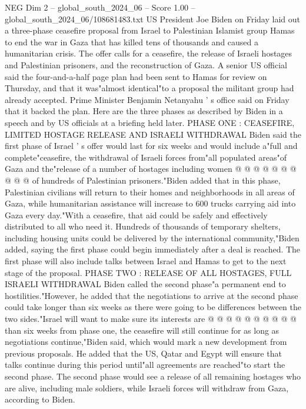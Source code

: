 \begin{textsample}{NEG Dim 2 – global\_south\_2024\_06 – Score 1.00 – global\_south\_2024\_06/108681483.txt}  \label{ex:f2_neg_324}
US President Joe Biden on Friday laid out a three-phase ceasefire proposal from Israel to Palestinian Islamist group Hamas to end the war in Gaza that has killed tens of thousands and caused a humanitarian crisis.
The offer calls for a ceasefire, the release of Israeli hostages and Palestinian prisoners, and the reconstruction of Gaza.
A senior US official said the four-and-a-half page plan had been sent to Hamas for review on Thursday, and that it was"almost identical"to a proposal the militant group had already accepted.
Prime Minister Benjamin Netanyahu ' s office said on Friday that it backed the plan.
Here are the three phases as described by Biden in a speech and by US officials at a briefing held later.
PHASE ONE : CEASEFIRE, LIMITED HOSTAGE RELEASE AND ISRAELI WITHDRAWAL Biden said the first phase of Israel ' s offer would last for six weeks and would include a"full and complete"ceasefire, the withdrawal of Israeli forces from"all populated areas"of Gaza and the"release of a number of hostages including women @ @ @ @ @ @ @ @ @ @ of hundreds of Palestinian prisoners."Biden added that in this phase, Palestinian civilians will return to their homes and neighborhoods in all areas of Gaza, while humanitarian assistance will increase to 600 trucks carrying aid into Gaza every day."With a ceasefire, that aid could be safely and effectively distributed to all who need it.
Hundreds of thousands of temporary shelters, including housing units could be delivered by the international community,"Biden added, saying the first phase could begin immediately after a deal is reached.
The first phase will also include talks between Israel and Hamas to get to the next stage of the proposal.
PHASE TWO : RELEASE OF ALL HOSTAGES, FULL ISRAELI WITHDRAWAL Biden called the second phase"a permanent end to hostilities."However, he added that the negotiations to arrive at the second phase could take longer than six weeks as there were going to be differences between the two sides."Israel will want to make sure its interests are @ @ @ @ @ @ @ @ @ @ than six weeks from phase one, the ceasefire will still continue for as long as negotiations continue,"Biden said, which would mark a new development from previous proposals.
He added that the US, Qatar and Egypt will ensure that talks continue during this period until"all agreements are reached"to start the second phase.
The second phase would see a release of all remaining hostages who are alive, including male soldiers, while Israeli forces will withdraw from Gaza, according to Biden.

\end{textsample}
